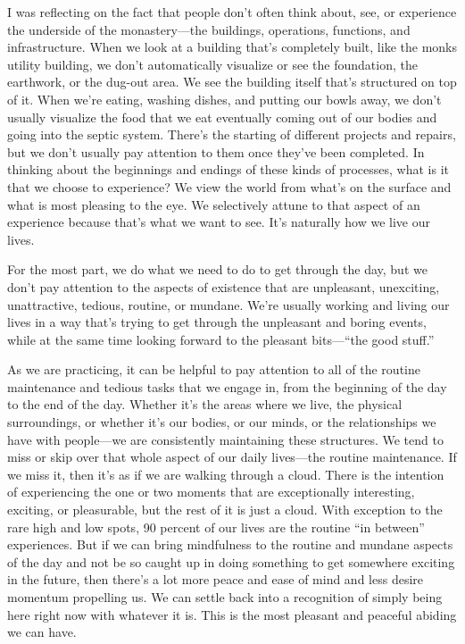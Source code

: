 I was reflecting on the fact that people don't often think about, see, 
or experience the underside of the monastery---the buildings, 
operations, functions, and infrastructure. When we look at a building 
that's completely built, like the monks utility building, we don't 
automatically visualize or see the foundation, the earthwork, or the 
dug-out area. We see the building itself that's structured on top of 
it. When we're eating, washing dishes, and putting our bowls away, we 
don't usually visualize the food that we eat eventually coming out of 
our bodies and going into the septic system. There's the starting of 
different projects and repairs, but we don't usually pay attention to 
them once they've been completed. In thinking about the beginnings and 
endings of these kinds of processes, what is it that we choose to 
experience? We view the world from what's on the surface and what is 
most pleasing to the eye. We selectively attune to that aspect of an 
experience because that's what we want to see. It's naturally how we 
live our lives.

For the most part, we do what we need to do to get through the day, but 
we don't pay attention to the aspects of existence that are unpleasant, 
unexciting, unattractive, tedious, routine, or mundane. We're usually 
working and living our lives in a way that's trying to get through the 
unpleasant and boring events, while at the same time looking forward to 
the pleasant bits---``the good stuff.''

As we are practicing, it can be helpful to pay attention to all of the 
routine maintenance and tedious tasks that we engage in, from the 
beginning of the day to the end of the day. Whether it's the areas 
where we live, the physical surroundings, or whether it's our bodies, 
or our minds, or the relationships we have with people---we are 
consistently maintaining these structures. We tend to miss or skip over 
that whole aspect of our daily lives---the routine maintenance. If we 
miss it, then it's as if we are walking through a cloud. There is the 
intention of experiencing the one or two moments that are exceptionally 
interesting, exciting, or pleasurable, but the rest of it is just a 
cloud. With exception to the rare high and low spots, 90 percent of our 
lives are the routine ``in between'' experiences. But if we can bring 
mindfulness to the routine and mundane aspects of the day and not be so 
caught up in doing something to get somewhere exciting in the future, 
then there's a lot more peace and ease of mind and less desire momentum 
propelling us. We can settle back into a recognition of simply being 
here right now with whatever it is. This is the most pleasant and 
peaceful abiding we can have.

